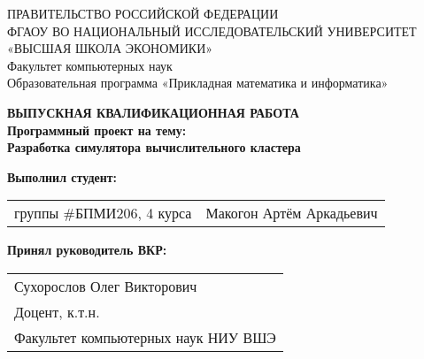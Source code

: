 \begin{titlepage}
  \newpage
  
  {
  \begin{center}
  ПРАВИТЕЛЬСТВО РОССИЙСКОЙ ФЕДЕРАЦИИ\\
  ФГАОУ ВО НАЦИОНАЛЬНЫЙ ИССЛЕДОВАТЕЛЬСКИЙ УНИВЕРСИТЕТ\\
  «ВЫСШАЯ ШКОЛА ЭКОНОМИКИ»
  \\
  \bigskip
  Факультет компьютерных наук\\
  Образовательная программа «Прикладная математика и информатика»
  \end{center}
  }
  
  \vspace{7em}
  
  \begin{center}
  {\bf ВЫПУСКНАЯ КВАЛИФИКАЦИОННАЯ РАБОТА}\\
  {\bf Программный проект на тему:}\\
  {\bf Разработка симулятора вычислительного кластера}\\
  \end{center}
  
  \vspace{2em}
  
  {\bf Выполнил студент: \vspace{2mm}}
  
  {
  \begin{tabular}{l@{\hskip 1.5cm}l}
  группы \#БПМИ206, 4 курса & Макогон Артём Аркадьевич 
  \end{tabular}}
  
  
  \vspace{1em}
  {\bf Принял руководитель ВКР: \vspace{2mm}}
  
  {
  \begin{tabular}{l}
  Сухорослов Олег Викторович\\
  Доцент, к.т.н. \\
  Факультет компьютерных наук НИУ ВШЭ 
  \end{tabular}}
  

\end{titlepage}
